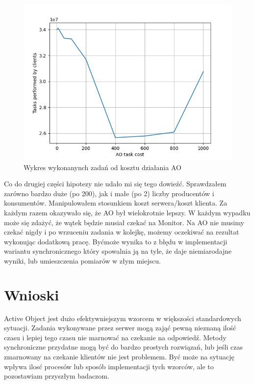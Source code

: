 \documentclass[12pt,a4paper,table]{article}
\begin{document}
    \begin{figure}[H]
        \centering
        \includegraphics[width=0.8\linewidth]{img/ao_100client.png}
        \caption{Wykres wykonanynch zadań od kosztu działania AO}
        \label{fig:ao_100client}
    \end{figure}


    Co do drugiej części hipotezy nie udało mi się tego dowieźć. Sprawdzałem zarówno bardzo duże (po 200),
    jak i małe (po 2) liczby producentów i konsumentów. Manipulowałem stosunkiem koszt serwera/koszt klienta.
    Za każdym razem okazywało się, że AO był wielokrotnie lepszy. W każdym wypadku może się zdażyć, że
    wątek będzie musiał czekać na Monitor. Na AO nie musimy czekać nigdy i po wrzuceniu zadania w kolejkę,
    możemy oczekiwać na rezultat wykonując dodatkową pracę. Byćmoże wynika to z błędu w implementacji 
    wariantu synchronicznego który spowalnia ją na tyle, że daje niemiarodajne wyniki, lub umieszczenia
    pomiarów w złym miejscu.

    \section{Wnioski}
    Active Object jest dużo efektywniejszym wzorcem w większości standardowych sytuacji.
    Zadania wykonywane przez serwer mogą zająć pewną nieznaną ilość czasu i lepiej tego czasu nie marnować
    na czekanie na odpowiedź.
    Metody synchroniczne przydatne mogą być do bardzo prostych rozwiązań,
    lub jeśli czas zmarnowany na czekanie klientów nie jest problemem.
    Być może na sytuację wpływa ilosć procesów lub sposób implementacji tych wzorców, ale 
    to pozostawiam przyszłym badaczom.


    
\end{document}
